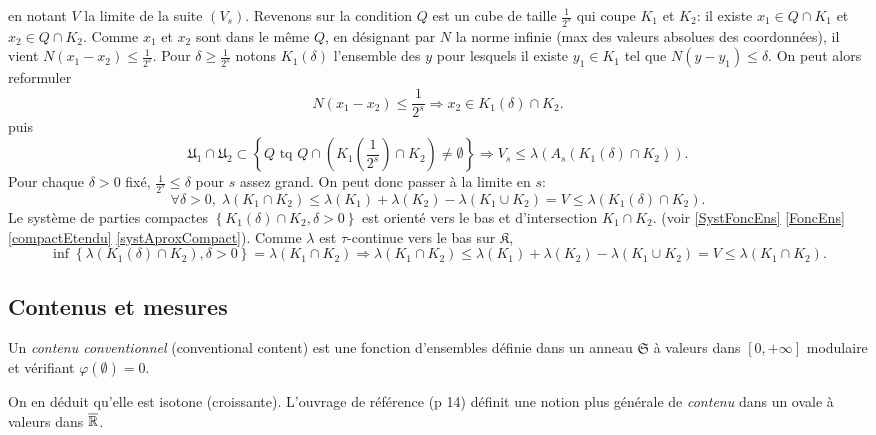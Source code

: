 \begin{demo}
en notant $V$ la limite de la suite $(V_s)$.\newline
Revenons sur la condition $Q$ est un cube de taille $\frac{1}{2^s}$ qui coupe $K_1$ et $K_2$: il existe $x_1\in Q \cap K_1$ et $x_2 \in Q \cap K_2$. Comme $x_1$ et $x_2$ sont dans le même $Q$, en désignant par $N$ la norme infinie (max des valeurs absolues des coordonnées), il vient $N(x_1-x_2)\leq \frac{1}{2^s}$. \newline
Pour $\delta \geq \frac{1}{2^s}$ notons $K_1(\delta)$ l'ensemble des $y$ pour lesquels il existe $y_1\in K_1$ tel que $N(y-y_1)\leq \delta$. On peut alors reformuler
\begin{displaymath}
 N(x_1-x_2)\leq \frac{1}{2^s} \Rightarrow x_2 \in K_1(\delta)\cap K_2.
\end{displaymath}
puis
\begin{displaymath}
 \mathfrak{U}_1 \cap \mathfrak{U}_2 \subset
 \left\lbrace Q \text{ tq } Q\cap (K_1(\frac{1}{2^s})\cap K_2 )\neq \emptyset \right\rbrace
 \Rightarrow
 V_s \leq \lambda(A_s(K_1(\delta)\cap K_2)).
\end{displaymath}
Pour chaque $\delta >0$ fixé, $\frac{1}{2^s}\leq \delta$ pour $s$  assez grand. On peut donc passer à la limite en $s$:
\begin{displaymath}
 \forall \delta > 0, \; \lambda(K_1 \cap K_2) \leq  \lambda(K_1) + \lambda(K_2) - \lambda(K_1 \cup K_2) = V \leq \lambda(K_1(\delta)\cap K_2).
\end{displaymath}
Le système de parties compactes $\left\lbrace K_1(\delta)\cap K_2, \delta > 0 \right\rbrace$ est orienté vers le bas et d'intersection $K_1 \cap K_2$. (voir \ref{SystFoncEns} \ref{FoncEns} \ref{compactEtendu} \ref{systAproxCompact}). Comme $\lambda$ est $\tau$-continue vers le bas sur $\mathfrak{K}$,
\begin{displaymath}
 \inf\left\lbrace \lambda(K_1(\delta)\cap K_2), \delta > 0 \right\rbrace =  \lambda(K_1 \cap K_2)
 \Rightarrow
 \lambda(K_1 \cap K_2) \leq  \lambda(K_1) + \lambda(K_2) - \lambda(K_1 \cup K_2) = V \leq \lambda(K_1 \cap K_2).
\end{displaymath}
\end{demo}


\subsection{Contenus et mesures} \label{ContenusMesures}
\begin{defi}
Un \emph{contenu conventionnel} (conventional content) est une fonction d'ensembles définie dans un anneau $\mathfrak{S}$ à valeurs dans $[0,+\infty]$ modulaire et vérifiant $\varphi(\emptyset)=0$.
\end{defi}
\noindent On en déduit qu'elle est isotone (croissante). L'ouvrage de référence (p 14) définit une notion plus générale de \emph{contenu} dans un ovale à valeurs dans $\overline{\mathbb{R}}$.

